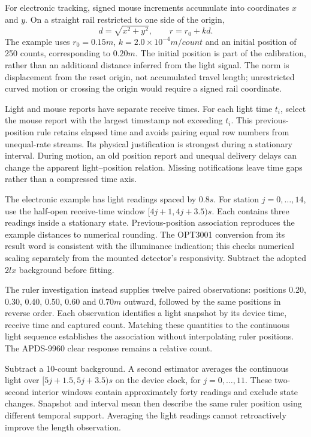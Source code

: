 For electronic tracking, signed mouse increments accumulate into coordinates $x$ and $y$. On a straight rail restricted to one side of the origin,
\begin{equation}
 d=\sqrt{x^2+y^2},\qquad r=r_0+kd.
 \label{eq:illuminance-distance-rail}
\end{equation}
The example uses $r_0=0.15\unit{m}$, $k=2.0\times10^{-4}\unit{m/count}$ and an initial position of 250 counts, corresponding to $0.20\unit{m}$. The initial position is part of the calibration, rather than an additional distance inferred from the light signal. The norm is displacement from the reset origin, not accumulated travel length; unrestricted curved motion or crossing the origin would require a signed rail coordinate.

Light and mouse reports have separate receive times. For each light time $t_i$, select the mouse report with the largest timestamp not exceeding $t_i$. This previous-position rule retains elapsed time and avoids pairing equal row numbers from unequal-rate streams. Its physical justification is strongest during a stationary interval. During motion, an old position report and unequal delivery delays can change the apparent light--position relation. Missing notifications leave time gaps rather than a compressed time axis.

The electronic example has light readings spaced by $0.8\unit{s}$. For station $j=0,\ldots,14$, use the half-open receive-time window $[4j+1,4j+3.5)\unit{s}$. Each contains three readings inside a stationary state. Previous-position association reproduces the example distances to numerical rounding. The OPT3001 conversion from its result word is consistent with the illuminance indication\cite{opt3001}; this checks numerical scaling separately from the mounted detector's responsivity. Subtract the adopted $2\unit{lx}$ background before fitting.

The ruler investigation instead supplies twelve paired observations: positions 0.20, 0.30, 0.40, 0.50, 0.60 and $0.70\unit{m}$ outward, followed by the same positions in reverse order. Each observation identifies a light snapshot by its device time, receive time and captured count. Matching these quantities to the continuous light sequence establishes the association without interpolating ruler positions. The APDS-9960 clear response remains a relative count\cite{apds9960}.

Subtract a 10-count background. A second estimator averages the continuous light over $[5j+1.5,5j+3.5)\unit{s}$ on the device clock, for $j=0,\ldots,11$. These two-second interior windows contain approximately forty readings and exclude state changes. Snapshot and interval mean then describe the same ruler position using different temporal support. Averaging the light readings cannot retroactively improve the length observation.

